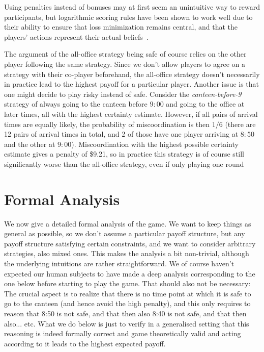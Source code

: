  Using penalties instead of bonuses may at first seem an unintuitive way to reward participants, but logarithmic scoring rules have been shown to work well due to their ability to ensure that loss minimization remains central, and that the players' actions represent their actual beliefs~\cite{good1992rational, seidenfeld1985calibration, palfrey2009eliciting, mccutcheon2019favor}.

The argument of the all-office strategy being safe of course relies on the other player following the same strategy. Since we don't allow players to agree on a strategy with their co-player beforehand, the all-office strategy doesn't necessarily in practice lead to the highest payoff for a particular player. Another issue is that one might decide to play risky instead of safe. Consider the \emph{canteen-before-9} strategy of always going to the canteen before $9{:}00$ and going to the office at later times, all with the highest certainty estimate.  However, if all pairs of arrival times are equally likely, the probability of miscoordination is then $1/6$ (there are 12 pairs of arrival times in total, and 2 of those have one player arriving at $8{:}50$ and the other at $9{:}00$). Miscoordination with the highest possible certainty estimate gives a penalty of \$9.21, so in practice this strategy is of course still significantly worse than the all-office strategy, even if only playing one round 

\section{Formal Analysis} \label{appendix:formal}
We now give a detailed formal analysis of the game. We want to keep things as general as possible, so we don't assume a particular payoff structure, but any payoff structure satisfying certain constraints, and we want to consider arbitrary strategies, also mixed ones. This makes the analysis a bit non-trivial, although the underlying intuitions are rather straightforward. We of course haven't expected our human subjects to have made a deep analysis corresponding to the one below before starting to play the game. That should also not be necessary: The crucial aspect is to realize that there is no time point at which it is safe to go to the canteen (and hence avoid the high penalty), and this only requires to reason that 8{:}50 is not safe, and that then also 8{:}40 is not safe, and that then also... etc. What we do below is just to verify in a generalised setting that this reasoning is indeed formally correct and game theoretically valid and acting according to it leads to the highest expected payoff.  

